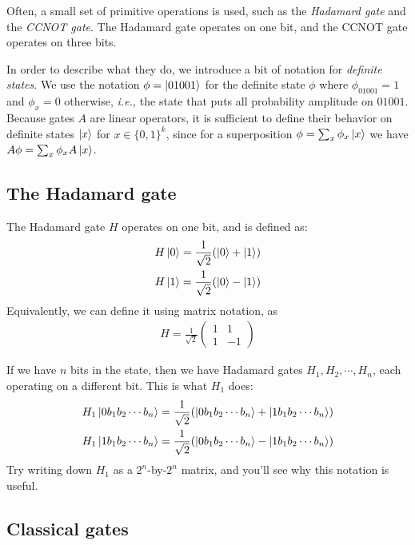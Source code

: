 \documentclass[a4paper, 11pt]{article}
\theoremstyle{definition}
\newcommand{\ie}{\textit{i.e.,}\xspace}
\begin{document}
Often, a small set of primitive operations is used, such as the \emph{Hadamard gate} and the \emph{CCNOT gate}.
The Hadamard gate operates on one bit, and the CCNOT gate operates on three bits.

In order to describe what they do, we introduce a bit of notation for \emph{definite states}.
We use the notation $\phi = \ket{01001}$ for the definite state $\phi$ where $\phi_{01001} = 1$ and $\phi_x = 0$ otherwise, \ie the state that puts all probability amplitude on $01001$.
Because gates $A$ are linear operators, it is sufficient to define their behavior on definite states $\ket{x}$ for $x \in \{0,1\}^k$,
since for a superposition $\phi = \sum_x \phi_x \ket{x}$ we have $A\phi = \sum_x \phi_x A \ket{x}$.

\subsection{The Hadamard gate}

\newcommand{\Ha}{H}
\newcommand{\CCNOT}{\mathsf{CCNOT}}

The Hadamard gate $\Ha$ operates on one bit, and is defined as:
\begin{align*}
  \Ha\ket{0} = \frac{1}{\sqrt{2}}(\ket{0} + \ket{1}) \\
  \Ha\ket{1} = \frac{1}{\sqrt{2}}(\ket{0} - \ket{1})
\end{align*}
Equivalently, we can define it using matrix notation, as
\begin{align*}
  \Ha = \frac{1}{\sqrt{2}}\begin{pmatrix}
    1 & 1 \\
    1 & -1
  \end{pmatrix}
\end{align*}

If we have $n$ bits in the state, then we have Hadamard gates $\Ha_1, \Ha_2, \cdots, \Ha_n$, each operating on a different bit.
This is what $\Ha_1$ does:
\begin{align*}
  \Ha_1 \ket{0 b_1 b_2 \cdots b_n} = \frac{1}{\sqrt{2}}(\ket{0 b_1 b_2 \cdots b_n} + \ket{1 b_1 b_2 \cdots b_n}) \\
  \Ha_1 \ket{1 b_1 b_2 \cdots b_n} = \frac{1}{\sqrt{2}}(\ket{0 b_1 b_2 \cdots b_n} - \ket{1 b_1 b_2 \cdots b_n})
\end{align*}
Try writing down $H_1$ as a $2^n$-by-$2^n$ matrix, and you'll see why this notation is useful.

\subsection{Classical gates}
\end{document}
